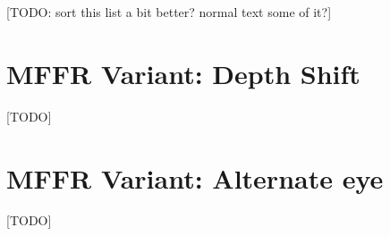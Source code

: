 [TODO: sort this list a bit better? normal text some of it?]



\section{MFFR Variant: Depth Shift}
[TODO]

\section{MFFR Variant: Alternate eye}
[TODO]
